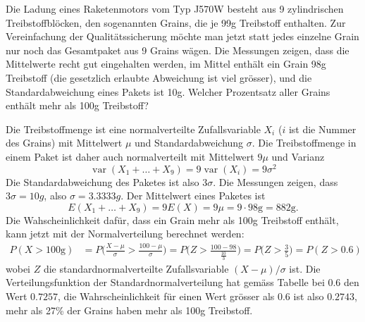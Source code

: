 Die Ladung eines Raketenmotors vom Typ J570W besteht aus 9 zylindrischen
Treibstoffblöcken, den sogenannten Grains,
die je 99g Treibstoff enthalten. Zur Vereinfachung der Qualitätssicherung
möchte man jetzt statt jedes einzelne Grain nur noch das Gesamtpaket
aus 9 Grains
wägen. Die Messungen zeigen, dass die Mittelwerte recht gut eingehalten
werden, im Mittel enthält ein Grain 98g Treibstoff (die gesetzlich erlaubte
Abweichung ist viel grösser), und die Standardabweichung eines Pakets
ist 10g. Welcher Prozentsatz aller Grains enthält mehr als 100g Treibstoff?

\begin{loesung}
Die Treibstoffmenge ist eine normalverteilte Zufallsvariable $X_i$
($i$ ist die Nummer des Grains)
mit Mittelwert $\mu$ und
Standardabweichung $\sigma$. Die Treibstoffmenge in einem
Paket ist daher auch normalverteilt mit Mittelwert $9\mu$ und
Varianz
\[
\operatorname{var}(X_1+\dots+X_9)=9\operatorname{var}(X_i)=9\sigma^2
\]
Die Standardabweichung des Paketes ist also $3\sigma$. Die Messungen
zeigen, dass $3\sigma=10g$, also $\sigma=3.3333g$. Der Mittelwert
eines Paketes ist
\[
E(X_1+\dots+X_9)=9E(X)=9\mu=9\cdot 98\text{g} = 882\text{g}.
\]
Die Wahscheinlichkeit dafür, dass ein Grain mehr als 100g Treibstoff
enthält, kann jetzt mit der Normalverteilung berechnet werden:
\begin{align*}
P(X>100\text{g})
&=
P\biggl(\frac{X-\mu}{\sigma}>\frac{100-\mu}{\sigma}\biggr)
=
P\biggl(Z>\frac{100-98}{\frac{10}{3}}\biggr)
=
P\biggl(Z>\frac{3}{5}\biggr)
=
P(Z > 0.6)
\end{align*}
wobei $Z$ die standardnormalverteilte Zufallsvariable $(X-\mu)/\sigma$ ist.
Die
Verteilungsfunktion der Standardnormalverteilung hat gemäss
Tabelle bei $0.6$
den Wert $0.7257$, die Wahrscheinlichkeit für einen Wert grösser
als $0.6$ ist also $0.2743$, mehr als 27\% der Grains haben mehr
als 100g Treibstoff.
\end{loesung}


